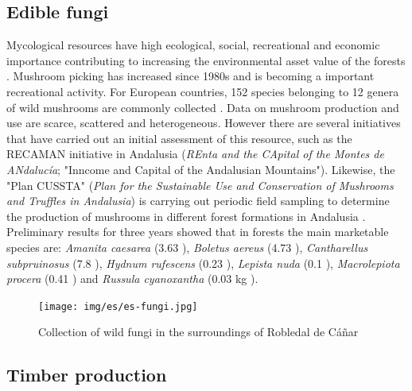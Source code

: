 \subsection{Edible fungi}\label{sec:es:provision-fungi}
Mycological resources have high ecological, social, recreational and economic importance contributing to increasing the environmental asset value of the forests \autocites{MartinezPenaetal2015RentaAmbiental}. Mushroom picking has increased since 1980s and is becoming a important recreational activity. For European countries, 152 species belonging to 12 genera of wild mushrooms are commonly collected \autocites{Schulpetal2014WildFood}. Data on mushroom production and use are scarce, scattered and heterogeneous. However there are several
initiatives that have carried out an initial assessment of this resource, such as the RECAMAN initiative in Andalusia (\emph{REnta and the CApital of the Montes de ANdalucía}; "Inncome and Capital of the Andalusian Mountains")\autocites{MartinezPenaetal2015RentaAmbiental}. Likewise, the "Plan CUSSTA" (\emph{Plan for the Sustainable Use and Conservation of Mushrooms and Truffles in Andalusia}) is carrying out periodic field sampling to determine the production of mushrooms in different forest formations in Andalusia \autocites{RayaLopezetal2017MuestreosPara}. Preliminary results for three years showed that in \Qp forests the main marketable species are: \emph{Amanita caesarea} (3.63 \khy), \emph{Boletus aereus} (4.73 \khy), \emph{Cantharellus subpruinosus} (7.8 \khy), \emph{Hydnum rufescens} (0.23 \khy), \emph{Lepista nuda} (0.1 \khy), \emph{Macrolepiota procera} (0.41 \khy) and \emph{Russula cyanoxantha} (0.03 kg \khy). 

\begin{figure}
    \centering
    \texttt{[image: img/es/es-fungi.jpg]}\caption{Collection of wild fungi in the surroundings of Robledal de Cáñar}\label{fig:es:fungi}
\end{figure}


\subsection{Timber production}\label{sec:es:provision-timber}

